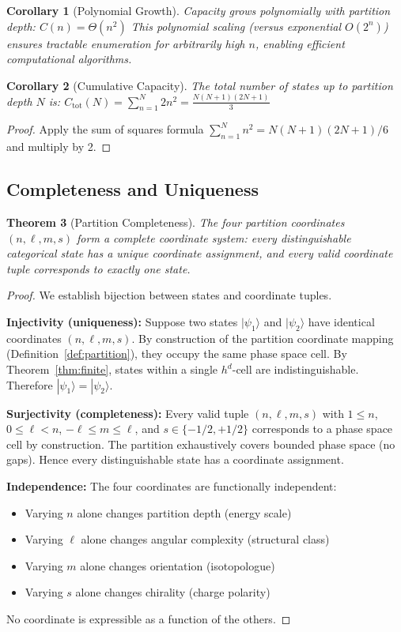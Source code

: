 \documentclass[twocolumn,10pt]{article}
\newtheorem{theorem}{Theorem}[section]
\newtheorem{corollary}[theorem]{Corollary}
\begin{document}
\begin{corollary}[Polynomial Growth]
\label{cor:polynomial}
Capacity grows polynomially with partition depth:
$
C(n) = \Theta(n^2)
$
This polynomial scaling (versus exponential $O(2^n)$) ensures tractable enumeration for arbitrarily high $n$, enabling efficient computational algorithms.
\end{corollary}

\begin{corollary}[Cumulative Capacity]
\label{cor:cumulative}
The total number of states up to partition depth $N$ is:
$
C_{\mathrm{tot}}(N) = \sum_{n=1}^{N} 2n^2 = \frac{N(N+1)(2N+1)}{3}
$
\end{corollary}

\begin{proof}
Apply the sum of squares formula $\sum_{n=1}^{N} n^2 = N(N+1)(2N+1)/6$ and multiply by 2.
\end{proof}

\subsection{Completeness and Uniqueness}

\begin{theorem}[Partition Completeness]
\label{thm:completeness}
The four partition coordinates $(n, \ell, m, s)$ form a complete coordinate system: every distinguishable categorical state has a unique coordinate assignment, and every valid coordinate tuple corresponds to exactly one state.
\end{theorem}

\begin{proof}
We establish bijection between states and coordinate tuples.

\textbf{Injectivity (uniqueness):} Suppose two states $|\psi_1\rangle$ and $|\psi_2\rangle$ have identical coordinates $(n, \ell, m, s)$. By construction of the partition coordinate mapping (Definition~\ref{def:partition}), they occupy the same phase space cell. By Theorem~\ref{thm:finite}, states within a single $h^d$-cell are indistinguishable. Therefore $|\psi_1\rangle = |\psi_2\rangle$.

\textbf{Surjectivity (completeness):} Every valid tuple $(n, \ell, m, s)$ with $1 \leq n$, $0 \leq \ell < n$, $-\ell \leq m \leq \ell$, and $s \in \{-1/2, +1/2\}$ corresponds to a phase space cell by construction. The partition exhaustively covers bounded phase space (no gaps). Hence every distinguishable state has a coordinate assignment.

\textbf{Independence:} The four coordinates are functionally independent:
\begin{itemize}
    \item Varying $n$ alone changes partition depth (energy scale)
    \item Varying $\ell$ alone changes angular complexity (structural class)
    \item Varying $m$ alone changes orientation (isotopologue)
    \item Varying $s$ alone changes chirality (charge polarity)
\end{itemize}
No coordinate is expressible as a function of the others.
\end{proof}
\end{document}
